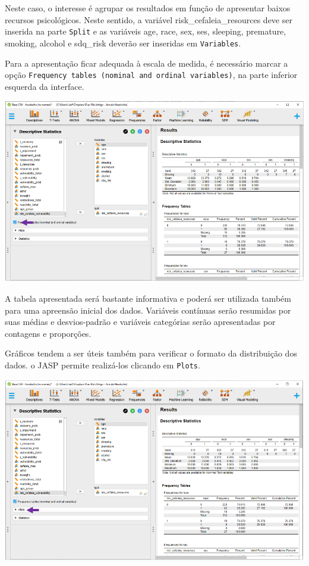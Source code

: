 \documentclass[
]{book}
\begin{document}
Neste caso, o interesse é agrupar os resultados em função de apresentar
baixos recursos psicológicos. Neste sentido, a variável
risk\_cefaleia\_resources deve ser inserida na parte \texttt{Split} e as
variáveis age, race, sex, ses, sleeping, premature, smoking, alcohol e
sdq\_risk deverão ser inseridas em \texttt{Variables}.

Para a apresentação ficar adequada à escala de medida, é necessário
marcar a opção
\texttt{Frequency\ tables\ (nominal\ and\ ordinal\ variables)}, na parte
inferior esquerda da interface.

\includegraphics{./img/cap_logistica_descriptives2.png}

A tabela apresentada será bastante informativa e poderá ser utilizada
também para uma apreensão inicial dos dados. Variáveis contínuas serão
resumidas por suas médias e desvios-padrão e variáveis categórias serão
apresentadas por contagens e proporções.

Gráficos tendem a ser úteis também para verificar o formato da
distribuição dos dados. o JASP permite realizá-los clicando em
\texttt{Plots}.

\includegraphics{./img/cap_logistica_plots.png}
\end{document}
